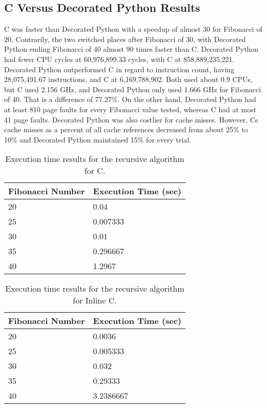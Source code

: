 \documentclass{sig-alternate}
\begin{document}
\subsection{C Versus Decorated Python Results}
C was faster than Decorated Python with a speedup of almost 30 for Fibonacci of 20. Contrarily, the two switched places after Fibonacci of 30, with Decorated Python ending Fibonacci of 40 almost 90 times faster than C. Decorated Python had fewer CPU cycles at 60,976,899.33 cycles, with C at 858,889,235,221. Decorated Python outperformed C in regard to instruction count, having 28,075,491.67 instructions, and C at 6,169,788,902. Both used about 0.9 CPUs, but C used 2.156 GHz, and Decorated Python only used 1.666 GHz for Fibonacci of 40. That is a difference of 77.27\%. On the other hand, Decorated Python had at least 810 page faults for every Fibonacci value tested, whereas C had at most 41 page faults. Decorated Python was also costlier for cache misses. However, Cs cache misses as a percent of all cache references decreased from about 25\% to 10\% and Decorated Python maintained 15\% for every trial.

\begin{scriptsize}
\begin{table}[ht!]
  \centering
  \begin{tabular}{|l|l|}
    \hline
    \textbf{Fibonacci Number} & \textbf{Execution Time (sec)}\\
    \hline
    20 & 0.04\\
    \hline
    25 & 0.007333\\
	\hline
	30 & 0.01\\
	\hline
	35 & 0.296667\\
	\hline
	40 & 1.2967\\
	\hline
\end{tabular}
\caption{Execution time results for the recursive algorithm for C.}
\label{table:formatting}
\end{table}
\end{scriptsize}

\begin{scriptsize}
\begin{table}[ht!]
  \centering
  \begin{tabular}{|l|l|}
    \hline
    \textbf{Fibonacci Number} & \textbf{Execution Time (sec)}\\
    \hline
    20 & 0.0036\\
    \hline
    25 & 0.005333\\
	\hline
	30 & 0.032\\
	\hline
	35 & 0.29333\\
	\hline
	40 & 3.2386667\\
	\hline
\end{tabular}
\caption{Execution time results for the recursive algorithm for Inline C.}
\label{table:formatting}
\end{table}
\end{scriptsize}
\end{document}
